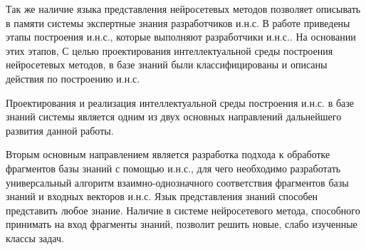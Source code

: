 Так же наличие языка представления нейросетевых методов позволяет описывать в памяти системы экспертные знания разработчиков и.н.с. В работе приведены этапы построения и.н.с., которые выполняют разработчики и.н.с.. На основании этих этапов, С целью проектирования интеллектуальной среды построения нейросетевых методов, в базе знаний были классифицированы и описаны действия по построению и.н.с.

Проектирования и реализация интеллектуальной среды построения и.н.с. в базе знаний системы является одним из двух основных направлений дальнейшего развития данной работы.

Вторым основным направлением является разработка подхода к обработке фрагментов базы знаний с помощью и.н.с., для чего необходимо разработать универсальный алгоритм взаимно-однозначного соответствия фрагментов базы знаний и входных векторов и.н.с. Язык представления знаний способен представить любое знание. Наличие в системе нейросетевого метода, способного принимать на вход фрагменты знаний, позволит решить новые, слабо изученные классы задач. 